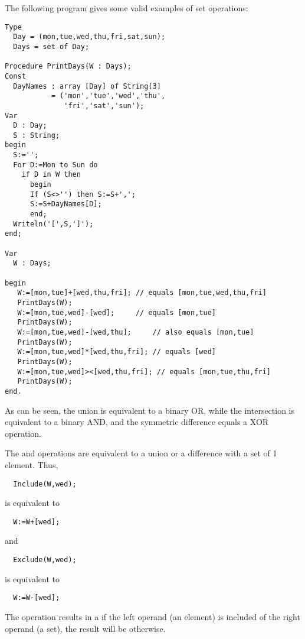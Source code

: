 The following program gives some valid examples of set operations:
\begin{verbatim}
Type
  Day = (mon,tue,wed,thu,fri,sat,sun);
  Days = set of Day;

Procedure PrintDays(W : Days);
Const
  DayNames : array [Day] of String[3]
           = ('mon','tue','wed','thu',
              'fri','sat','sun');
Var
  D : Day;
  S : String;
begin
  S:='';
  For D:=Mon to Sun do
    if D in W then
      begin
      If (S<>'') then S:=S+',';
      S:=S+DayNames[D];
      end;
  Writeln('[',S,']');
end;

Var
  W : Days;

begin
   W:=[mon,tue]+[wed,thu,fri]; // equals [mon,tue,wed,thu,fri]
   PrintDays(W);
   W:=[mon,tue,wed]-[wed];     // equals [mon,tue]
   PrintDays(W);
   W:=[mon,tue,wed]-[wed,thu];     // also equals [mon,tue]
   PrintDays(W);
   W:=[mon,tue,wed]*[wed,thu,fri]; // equals [wed]
   PrintDays(W);
   W:=[mon,tue,wed]><[wed,thu,fri]; // equals [mon,tue,thu,fri]
   PrintDays(W);
end. 
\end{verbatim}
As can be seen, the union is equivalent to a binary OR, while the
intersection is equivalent to a binary AND, and the symmetric difference
equals a XOR operation.

The  and  operations are equivalent to a union
or a difference with a set of 1 element. Thus,
\begin{verbatim}
  Include(W,wed);
\end{verbatim}
is equivalent to 
\begin{verbatim}
  W:=W+[wed];
\end{verbatim}
and
\begin{verbatim}
  Exclude(W,wed);
\end{verbatim}
is equivalent to
\begin{verbatim}
  W:=W-[wed];
\end{verbatim}

The  operation results in a  if the left operand
(an element) is included of the right operand (a set), the result
will be  otherwise.

%
